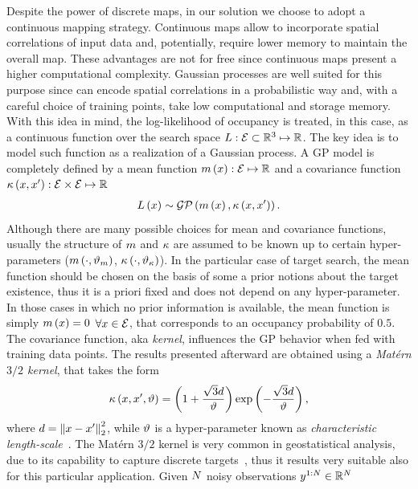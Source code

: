 Despite the power of discrete maps, in our solution we choose to adopt a continuous mapping strategy.
Continuous maps allow to incorporate spatial correlations of input data and, potentially, require lower memory to maintain the overall map.
These advantages are not for free since continuous maps present a higher computational complexity. Gaussian processes are well suited for
this purpose since can encode spatial correlations in a probabilistic way and, with a careful choice of training points, take low
computational and storage memory. With this idea in mind, the log-likelihood of occupancy is treated, in this case, as a continuous
function over the search space $L:\mathcal{E} \subset \mathbb{R}^3 \mapsto \mathbb{R}$. The key idea is to model such function as a realization of a Gaussian
process. A GP model is completely defined by a mean function $m \left( x \right): \mathcal{E} \mapsto \mathbb{R}$ and a covariance function
$\kappa \left( x, x' \right): \mathcal{E} \times \mathcal{E} \mapsto \mathbb{R}$
\begin{align*}
	L \left( x \right) \sim \mathcal{GP} \left( m \left( x \right), \kappa \left( x,x' \right) \right).
\end{align*}
Although there are many possible choices for mean and covariance functions, usually the structure of $m$ and $\kappa$ are assumed to be
known up to certain hyper-parameters ($m \left( \cdot, \vartheta_{m} \right)$, $\kappa \left( \cdot, \vartheta_{\kappa} \right)$).
In the particular case of target search, the mean function should be chosen on the basis of some a prior notions about the target existence,
thus it is a priori fixed and does not depend on any hyper-parameter. In those cases in which no prior information is available,
the mean function is simply $m \left( x \right) = 0$  $\forall x \in \mathcal{E}$, that corresponds to an occupancy probability of $0.5$.
The covariance function, aka \textit{kernel}, influences the GP behavior when fed with training data points.
The results presented afterward are obtained using a \textit{Matérn $3/2$ kernel}, that takes the form
\begin{equation*}
	\kappa  \left( x, x', \vartheta \right) = \left( 1 + \frac{\sqrt{3} d}{\vartheta} \right) \exp \left( - \frac{\sqrt{3} d }{\vartheta} \right), 
\end{equation*}
where $d = \left \lVert {x- x'} \right \rVert^2_2$, while $\vartheta$ is a hyper-parameter known as \textit{characteristic length-scale}~\cite{rasmussen2003gaussian}.
The Matérn $3/2$ kernel is very common in geostatistical analysis, due to its capability to capture discrete targets~\cite{meera2019obstacle},
thus it results very suitable also for this particular application. Given $N$ noisy observations $y^{1:N} \in \mathbb{R}^{N}$

